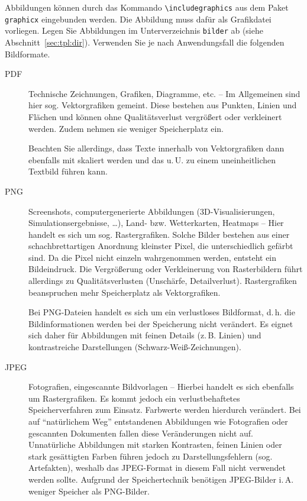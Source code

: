 Abbildungen können durch das Kommando \lstinline+\includegraphics+ aus dem Paket
\texttt{graphicx} eingebunden werden. Die Abbildung muss dafür als Grafikdatei
vorliegen. Legen Sie Abbildungen im Unterverzeichnis \texttt{bilder} ab
(siehe Abschnitt~\ref{sec:tpl:dir}). Verwenden Sie je nach Anwendungsfall die
folgenden Bildformate.

\begin{description}
\item[PDF] Technische Zeichnungen, Grafiken, Diagramme, etc. -- Im Allgemeinen
  sind hier sog. Vektorgrafiken gemeint. Diese bestehen aus Punkten, Linien
  und Flächen und können ohne Qualitätsverlust vergrößert oder verkleinert
  werden. Zudem nehmen sie weniger Speicherplatz ein.

  Beachten Sie allerdings, dass Texte innerhalb von Vektorgrafiken dann
  ebenfalls mit skaliert werden und das u.\,U. zu einem uneinheitlichen
  Textbild führen kann.

\item[PNG] Screenshots, computergenerierte Abbildungen (3D-Visualisierungen,
  Simulationsergebnisse, \dots), Land- bzw. Wetterkarten, Heatmaps -- Hier
  handelt es sich um sog. Rastergrafiken. Solche Bilder bestehen aus einer
  schachbrettartigen Anordnung kleinster Pixel, die unterschiedlich gefärbt
  sind. Da die Pixel nicht einzeln wahrgenommen werden, entsteht ein
  Bildeindruck. Die Vergrößerung oder Verkleinerung von Rasterbildern führt
  allerdings zu Qualitätsverlusten (Unschärfe, Detailverlust). Rastergrafiken
  beanspruchen mehr Speicherplatz als Vektorgrafiken.

  Bei PNG-Dateien handelt es sich um ein verlustloses Bildformat, d.\,h. die
  Bildinformationen werden bei der Speicherung nicht verändert. Es eignet sich
  daher für Abbildungen mit feinen Details (z.\,B. Linien) und kontrastreiche
  Darstellungen (Schwarz-Weiß-Zeichnungen).

\item[JPEG] Fotografien, eingescannte Bildvorlagen -- Hierbei handelt es sich
  ebenfalls um Rastergrafiken. Es kommt jedoch ein verlustbehaftetes
  Speicherverfahren zum Einsatz. Farbwerte werden hierdurch verändert. Bei
  auf "`natürlichem Weg"' entstandenen Abbildungen wie Fotografien oder
  gescannten Dokumenten fallen diese Veränderungen nicht auf. Unnatürliche
  Abbildungen mit starken Kontrasten, feinen Linien oder stark gesättigten
  Farben führen jedoch zu Darstellungsfehlern (sog. Artefakten), weshalb das
  JPEG-Format in diesem Fall nicht verwendet werden sollte. Aufgrund der
  Speichertechnik benötigen JPEG-Bilder i.\,A. weniger Speicher als PNG-Bilder.
\end{description}

